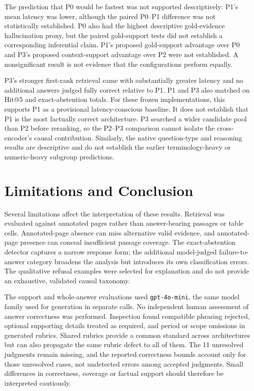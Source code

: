 The prediction that P0 would be fastest was not supported descriptively:
P1's mean latency was lower, although the paired P0--P1 difference was not
statistically established. P0 also had the highest descriptive gold-evidence
hallucination proxy, but the paired gold-support tests did not establish a
corresponding inferential claim. P1's proposed gold-support advantage over
P0 and P3's proposed context-support advantage over P2 were not established.
A nonsignificant result is not evidence that the configurations perform equally.

P3's stronger first-rank retrieval came with substantially greater latency
and no additional answers judged fully correct relative to P1. P1 and P3
also matched on Hit@5 and exact-abstention totals. For these frozen
implementations, this supports P1 as a provisional latency-conscious baseline.
It does not establish that P1 is the most factually correct architecture.
P3 searched a wider candidate pool than P2 before reranking, so the P2--P3
comparison cannot isolate the cross-encoder's causal contribution. Similarly,
the native question-type and reasoning results are descriptive and do not
establish the earlier terminology-heavy or numeric-heavy subgroup predictions.

\section{Limitations and Conclusion}
\fontsize{11}{13}\selectfont

Several limitations affect the interpretation of these results. Retrieval was
evaluated against annotated pages rather than answer-bearing passages or
table cells. Annotated-page absence can miss alternative valid evidence,
and annotated-page presence can conceal insufficient passage coverage.
The exact-abstention detector captures a narrow response form; the additional
model-judged failure-to-answer category broadens the analysis but introduces
its own classification errors. The qualitative refusal examples were selected
for explanation and do not provide an exhaustive, validated causal taxonomy.

The support and whole-answer evaluations used \texttt{gpt-4o-mini}, the same
model family used for generation in separate calls. No independent human
assessment of answer correctness was performed. Inspection found compatible
phrasing rejected, optional supporting details treated as required, and
period or scope omissions in generated rubrics. Shared rubrics provide a
common standard across architectures but can also propagate the same rubric
defect to all of them. The 11 unresolved judgments remain missing, and the
reported correctness bounds account only for those unresolved cases, not
undetected errors among accepted judgments. Small differences in correctness,
coverage or factual support should therefore be interpreted cautiously.

